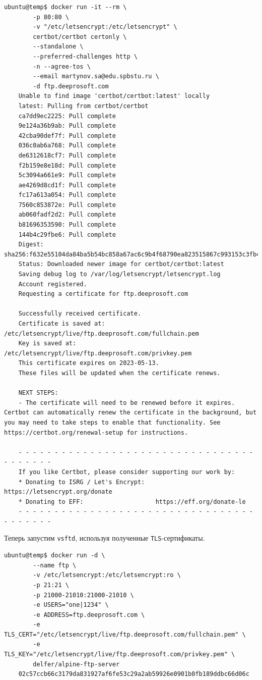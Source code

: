 \begin{Verbatim}[frame=single,breaklines=true,breakanywhere=true]
    ubuntu@temp$ docker run -it --rm \
        -p 80:80 \
        -v "/etc/letsencrypt:/etc/letsencrypt" \
        certbot/certbot certonly \
        --standalone \
        --preferred-challenges http \
        -n --agree-tos \
        --email martynov.sa@edu.spbstu.ru \
        -d ftp.deeprosoft.com
    Unable to find image 'certbot/certbot:latest' locally
    latest: Pulling from certbot/certbot
    ca7dd9ec2225: Pull complete 
    9e124a36b9ab: Pull complete 
    42cba90def7f: Pull complete 
    036c0ab6a768: Pull complete 
    de6312618cf7: Pull complete 
    f2b159e8e18d: Pull complete 
    5c3094a661e9: Pull complete 
    ae4269d8cd1f: Pull complete 
    fc17a613a054: Pull complete 
    7560c853872e: Pull complete 
    ab060fadf2d2: Pull complete 
    b81696353590: Pull complete 
    144b4c29fbe6: Pull complete 
    Digest: sha256:f632e55104da84ba5b54bc858a67ac6c9b4f68790ea823515867c993153c3fb4
    Status: Downloaded newer image for certbot/certbot:latest
    Saving debug log to /var/log/letsencrypt/letsencrypt.log
    Account registered.
    Requesting a certificate for ftp.deeprosoft.com

    Successfully received certificate.
    Certificate is saved at: /etc/letsencrypt/live/ftp.deeprosoft.com/fullchain.pem
    Key is saved at:         /etc/letsencrypt/live/ftp.deeprosoft.com/privkey.pem
    This certificate expires on 2023-05-13.
    These files will be updated when the certificate renews.

    NEXT STEPS:
    - The certificate will need to be renewed before it expires. Certbot can automatically renew the certificate in the background, but you may need to take steps to enable that functionality. See https://certbot.org/renewal-setup for instructions.

    - - - - - - - - - - - - - - - - - - - - - - - - - - - - - - - - - - - - - - - -
    If you like Certbot, please consider supporting our work by:
    * Donating to ISRG / Let's Encrypt:   https://letsencrypt.org/donate
    * Donating to EFF:                    https://eff.org/donate-le
    - - - - - - - - - - - - - - - - - - - - - - - - - - - - - - - - - - - - - - - -
\end{Verbatim}

Теперь запустим \texttt{vsftd}, используя полученные \texttt{TLS}-сертификаты.

\begin{Verbatim}[frame=single,breaklines=true,breakanywhere=true]
    ubuntu@temp$ docker run -d \
        --name ftp \
        -v /etc/letsencrypt:/etc/letsencrypt:ro \
        -p 21:21 \
        -p 21000-21010:21000-21010 \
        -e USERS="one|1234" \
        -e ADDRESS=ftp.deeprosoft.com \
        -e TLS_CERT="/etc/letsencrypt/live/ftp.deeprosoft.com/fullchain.pem" \
        -e TLS_KEY="/etc/letsencrypt/live/ftp.deeprosoft.com/privkey.pem" \
        delfer/alpine-ftp-server
    02c57ccb66c3179da831927af6fe53c29a2ab59926e0901b0fb189ddbc66d06c
\end{Verbatim}

